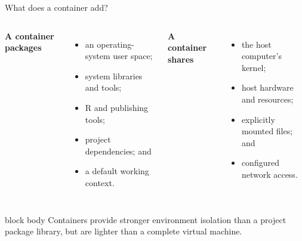 \documentclass[10pt,aspectratio=169]{beamer}
\begin{document}
\begin{frame}{What does a container add?}

\small

\begin{columns}[T]


\textbf{A container packages}

\begin{itemize}
  \item an operating-system user space;
  \item system libraries and tools;
  \item R and publishing tools;
  \item project dependencies; and
  \item a default working context.
\end{itemize}


\textbf{A container shares}

\begin{itemize}
  \item the host computer's kernel;
  \item host hardware and resources;
  \item explicitly mounted files; and
  \item configured network access.
\end{itemize}

\end{columns}

\vspace{0.25cm}

\begin{beamercolorbox}[rounded=true,sep=8pt]{block body}
Containers provide stronger environment isolation than a project package library, but are lighter than a complete virtual machine.
\end{beamercolorbox}

\end{frame}
\end{document}

